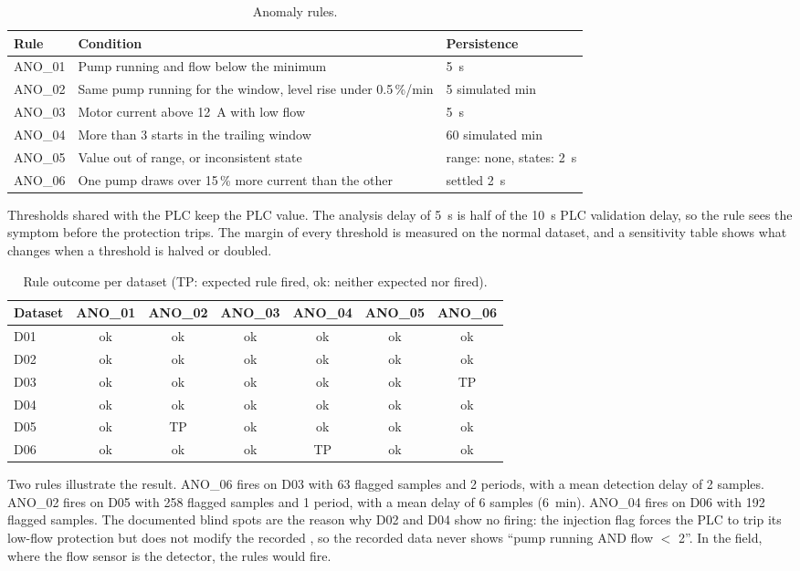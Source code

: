 \documentclass[11pt,a4paper]{report}
\newcommand{\tg}[1]{\texttt{\detokenize{#1}}}
\begin{document}
	\begin{table}[H]\centering\small
		\begin{tabularx}{\linewidth}{|l|Y|l|}
			\hline
			Rule & Condition & Persistence \\
			\hline
			ANO\_01 & Pump running and flow below the minimum & 5~s \\
			ANO\_02 & Same pump running for the window, level rise under 0.5\,\%/min & 5 simulated min \\
			ANO\_03 & Motor current above 12~A with low flow & 5~s \\
			ANO\_04 & More than 3 starts in the trailing window & 60 simulated min \\
			ANO\_05 & Value out of range, or inconsistent state & range: none, states: 2~s \\
			ANO\_06 & One pump draws over 15\,\% more current than the other & settled 2~s \\
			\hline
		\end{tabularx}
		\caption{Anomaly rules.}\label{tab:rules}
	\end{table}
	
	Thresholds shared with the PLC keep the PLC value. The analysis delay of 5~s is half of the 10~s PLC validation delay, so the rule sees the symptom before the protection trips. The margin of every threshold is measured on the normal dataset, and a sensitivity table shows what changes when a threshold is halved or doubled.
	
	\begin{table}[H]\centering\small
		\begin{tabular}{|l|c|c|c|c|c|c|}
			\hline
			Dataset & ANO\_01 & ANO\_02 & ANO\_03 & ANO\_04 & ANO\_05 & ANO\_06 \\
			\hline
			D01 & ok & ok & ok & ok & ok & ok \\
			D02 & ok & ok & ok & ok & ok & ok \\
			D03 & ok & ok & ok & ok & ok & TP \\
			D04 & ok & ok & ok & ok & ok & ok \\
			D05 & ok & TP & ok & ok & ok & ok \\
			D06 & ok & ok & ok & TP & ok & ok \\
			\hline
		\end{tabular}
		\caption{Rule outcome per dataset (TP: expected rule fired, ok: neither expected nor fired).}\label{tab:matrix}
	\end{table}
	
	Two rules illustrate the result. ANO\_06 fires on D03 with 63 flagged samples and 2 periods, with a mean detection delay of 2 samples. ANO\_02 fires on D05 with 258 flagged samples and 1 period, with a mean delay of 6 samples (6~min). ANO\_04 fires on D06 with 192 flagged samples. The documented blind spots are the reason why D02 and D04 show no firing: the injection flag forces the PLC to trip its low-flow protection but does not modify the recorded \tg{Flow_m3h}, so the recorded data never shows ``pump running AND flow $<$ 2''. In the field, where the flow sensor is the detector, the rules would fire.
	
\end{document}

